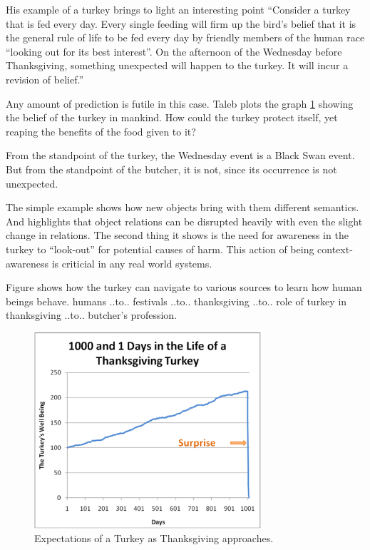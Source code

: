 His example of a turkey brings to light an interesting point ``Consider a turkey that is fed every day. Every single feeding will firm up the bird's belief that it is the general rule of life to be fed every day by friendly members of the human race ``looking out for its best interest''. On the afternoon of the Wednesday before Thanksgiving, something unexpected will happen to the turkey. It will incur a revision of belief.''

Any amount of prediction is futile in this case. Taleb plots the graph \ref{fig:turkey} showing the belief of the turkey in mankind. How could the turkey protect itself, yet reaping the benefits of the food given to it? 

From the standpoint of the turkey, the Wednesday event is a Black Swan event. But from the standpoint of the butcher, it is not, since its occurrence is not unexpected.

The simple example shows how new objects bring with them different semantics. And highlights that object relations can be disrupted heavily with even the slight change in relations. The second thing it shows is the need for awareness in the turkey to ``look-out'' for potential causes of harm. This action of being context-awareness is criticial in any real world systems.

Figure shows how the turkey can navigate to various sources to learn how human beings behave. humans ..to.. festivals ..to.. thanksgiving ..to.. role of turkey in thanksgiving ..to.. butcher's profession.

\begin{figure}[t]
\centering
\includegraphics[width=0.75\textwidth]{media/chapter2/turkey.png}
\caption{Expectations of a Turkey as Thanksgiving approaches.}
\label{fig:turkey}
\end{figure}

